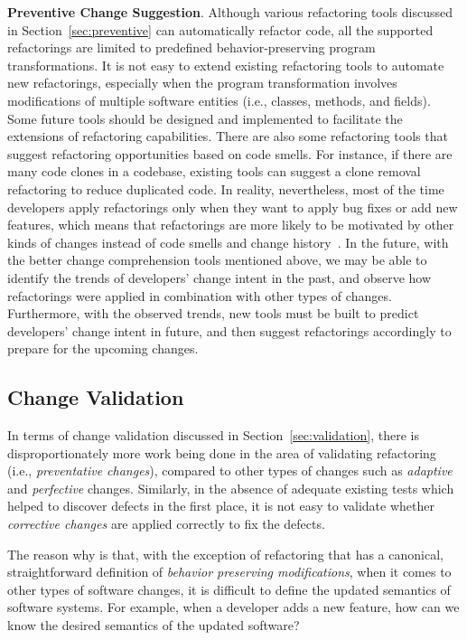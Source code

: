 \textbf{Preventive Change Suggestion}.
Although various refactoring tools discussed in Section~\ref{sec:preventive} can automatically refactor code, all the supported refactorings are limited to predefined behavior-preserving program transformations. It is not easy to extend existing refactoring tools to automate new refactorings, especially when the program transformation involves modifications of multiple software entities (i.e., classes, methods, and fields). Some future tools should be designed and implemented to facilitate the extensions of refactoring capabilities.
There are also some refactoring tools that suggest refactoring opportunities based on code smells. For instance, if there are many code clones in a codebase, existing tools can suggest a clone removal refactoring to reduce duplicated code. In reality, nevertheless, most of the time developers apply refactorings only when they want to apply bug fixes or add new features, which means that refactorings are more likely to be motivated by other kinds of changes instead of code smells and change history~\cite{Silva2016:WWR}. In the future, with the better change comprehension tools mentioned above, we may be able to identify the trends of developers' change intent in the past, and observe how refactorings were applied in combination with other types of changes. Furthermore, with the observed trends, new tools must be built to predict developers' change intent in future, and then suggest refactorings accordingly to prepare for the upcoming changes.


\subsection{Change Validation}
In terms of change validation discussed in Section~\ref{sec:validation}, there is disproportionately more work being done in the area of validating refactoring (i.e., {\em preventative changes}), compared to other types of changes such as {\em adaptive} and {\em perfective} changes. Similarly, in the absence of adequate existing tests which helped to discover defects in the first place, it is not easy to validate whether {\em corrective changes} are applied correctly to fix the defects. 

The reason why is that, with the exception of refactoring that has a canonical, straightforward definition of {\em behavior preserving modifications}, when it comes to other types of software changes, it is difficult to define the updated semantics of software systems. For example, when a developer adds a new feature, how can we know the desired semantics of the updated software?

